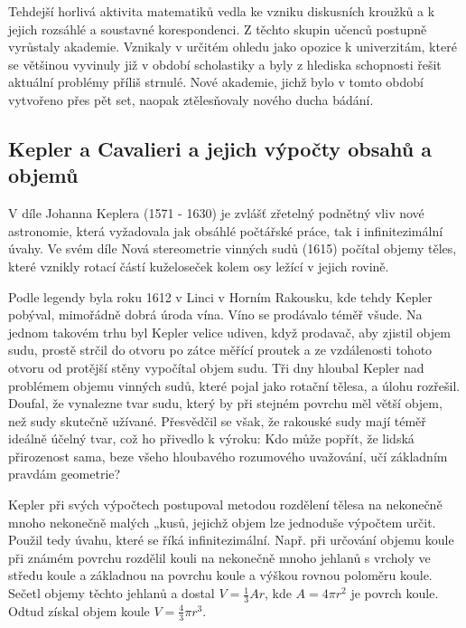       Tehdejší horlivá aktivita matematiků vedla ke vzniku diskusních kroužků a k jejich rozsáhlé a
      soustavné korespondenci. Z těchto skupin učenců postupně vyrůstaly akademie. Vznikaly v
      určitém ohledu jako opozice k univerzitám, které se většinou vyvinuly již v období scholastiky
      a byly z hlediska schopnosti řešit aktuální problémy příliš strnulé. Nové akademie, jichž bylo
      v tomto období vytvořeno přes pět set, naopak ztělesňovaly nového ducha bádání.
    
    \subsection{Kepler a Cavalieri a jejich výpočty obsahů a objemů}    
      V díle Johanna Keplera (1571 - 1630) je zvlášť zřetelný podnětný vliv nové astronomie, která
      vyžadovala jak obsáhlé počtářské práce, tak i infinitezimální úvahy. Ve svém díle Nová
      stereometrie vinných sudů (1615) počítal objemy těles, které vznikly rotací částí kuželoseček
      kolem osy ležící v jejich rovině.
      
      Podle legendy byla roku 1612 v Linci v Horním Rakousku, kde tehdy Kepler pobýval, mimořádně
      dobrá úroda vína. Víno se prodávalo téměř všude. Na jednom takovém trhu byl Kepler velice
      udiven, když prodavač, aby zjistil objem sudu, prostě strčil do otvoru po zátce měřící proutek
      a ze vzdálenosti tohoto otvoru od protější stěny vypočítal objem sudu. Tři dny hloubal Kepler
      nad problémem objemu vinných sudů, které pojal jako rotační tělesa, a úlohu rozřešil. Doufal,
      že vynalezne tvar sudu, který by při stejném povrchu měl větší objem, než sudy skutečně
      užívané. Přesvědčil se však, že rakouské sudy mají téměř ideálně účelný tvar, což ho přivedlo
      k výroku: Kdo může popřít, že lidská přirozenost sama, beze všeho hloubavého rozumového
      uvažování, učí základním pravdám geometrie?

      Kepler při svých výpočtech postupoval metodou rozdělení tělesa na nekonečně mnoho nekonečně
      malých „kusů, jejichž objem lze jednoduše výpočtem určit. Použil tedy úvahu, které se říká
      infinitezimální. Např. při určování objemu koule při známém povrchu rozdělil kouli na
      nekonečně mnoho jehlanů s vrcholy ve středu koule a základnou na povrchu koule a výškou rovnou
      poloměru koule. Sečetl objemy těchto jehlanů a dostal \(V = \frac{1}{3}Ar\), kde \(A =
      4πr^2\) je povrch koule. Odtud získal objem koule \(V = \frac{4}{3}πr^3\). 
      

